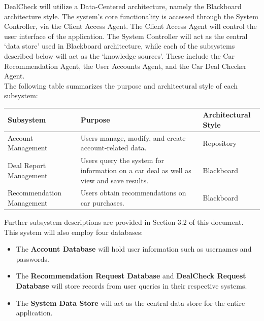 \documentclass[]{article}
\begin{document}
\label{sub:system_architecture}

\indent \indent DealCheck will utilize a Data-Centered architecture, namely the Blackboard architecture style. The system’s core functionality is accessed through the System Controller, via the Client Access Agent. The Client Access Agent will control the user interface of the application. The System Controller will act as the central ‘data store’ used in Blackboard architecture, while each of the subsystems described below will act as the ‘knowledge sources’. These include the Car Recommendation Agent, the User Accounts Agent, and the Car Deal Checker Agent. \\

\noindent The following table summarizes the purpose and architectural style of each subsystem:
\FloatBarrier
\begin{table}[H]
  \centering
  \begin{tabular}{|p{5cm}|p{7cm}|p{3cm}|}
    \hline
    \textbf{Subsystem}        & \textbf{Purpose}                                                                       & \textbf{Architectural Style} \\
    \hline
    Account Management        & Users manage, modify, and create account-related data.                                 & Repository                   \\
    \hline
    Deal Report Management    & Users query the system for information on a car deal as well as view and save results. & Blackboard                   \\
    \hline
    Recommendation Management & Users obtain recommendations on car purchases.                                         & Blackboard                   \\
    \hline
  \end{tabular}
  \label{tab:dealcheck_subsystems}
\end{table}
\FloatBarrier
\noindent
Further subsystem descriptions are provided in Section 3.2 of this document. \\
\newline
This system will also employ four databases:
\begin{itemize}
  \item The \textbf{Account Database} will hold user information such as usernames and passwords.
  \item The \textbf{Recommendation Request Database} and \textbf{DealCheck Request Database} will store records from user queries in their respective systems.
  \item The \textbf{System Data Store} will act as the central data store for the entire application.
\end{itemize}
\end{document}
